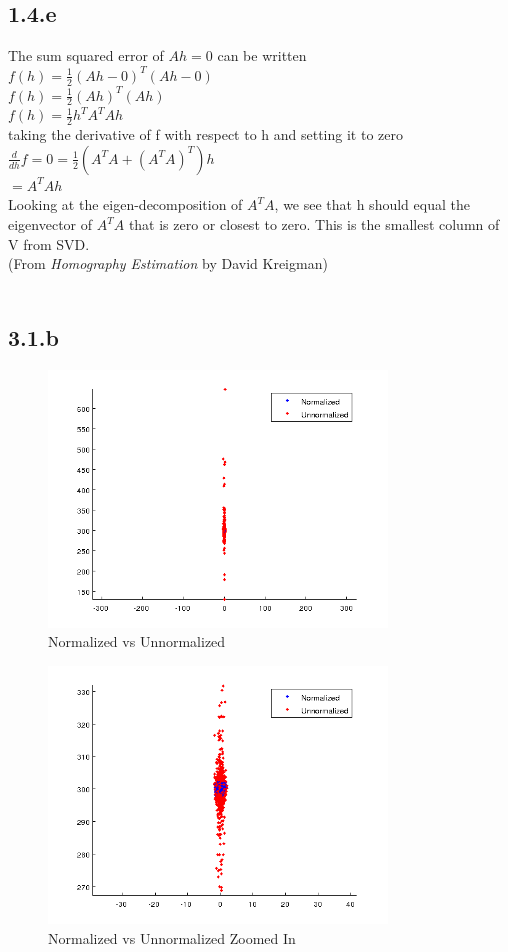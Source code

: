 \documentclass[11pt]{article}
\begin{document}
\subsection*{1.4.e}
The sum squared error of $Ah = 0$ can be written\\
$f(h) = \frac{1}{2}(Ah - 0)^T(Ah-0)$\\
$f(h) = \frac{1}{2}(Ah)^T(Ah)$\\
$f(h) = \frac{1}{2}h^TA^TAh$\\
taking the derivative of f with respect to h and setting it to zero\\
$\frac{d}{dh}f = 0 = \frac{1}{2}(A^TA + (A^TA)^T)h$\\
$ = A^TAh$\\
Looking at the eigen-decomposition of $A^TA$, we see that h should equal the eigenvector of $A^TA$ that is zero or closest to zero. This is the smallest column of V from SVD. \\
(From \textit{Homography Estimation} by David Kreigman)
\\
\\
\subsection*{3.1.b}

\begin{figure}[H]
\centering
\includegraphics[width=90mm]{results/q3_1.png}
\caption{Normalized vs Unnormalized }
\end{figure}
\begin{figure}[H]
\centering
\includegraphics[width=90mm]{results/q3_1zoomed.png}
\caption{Normalized vs Unnormalized Zoomed In }
\end{figure}
\end{document}
